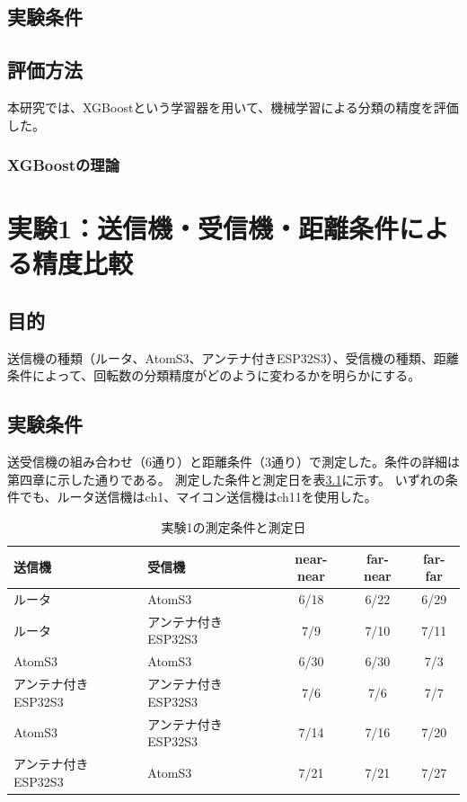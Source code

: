 \documentclass[uplatex, 12pt]{ujbook}
\begin{document}
\section{実験条件}

\section{評価方法}
本研究では、XGBoostという学習器を用いて、機械学習による分類の精度を評価した。
\subsection{XGBoostの理論}

\chapter{実験1：送信機・受信機・距離条件による精度比較}
\section{目的}
送信機の種類（ルータ、AtomS3、アンテナ付きESP32S3）、受信機の種類、距離条件によって、回転数の分類精度がどのように変わるかを明らかにする。
\section{実験条件}
送受信機の組み合わせ（6通り）と距離条件（3通り）で測定した。条件の詳細は第四章に示した通りである。
測定した条件と測定日を表\ref{tab:exp1}に示す。
いずれの条件でも、ルータ送信機はch1、マイコン送信機はch11を使用した。

\begin{table}[htbp]
  \centering
  \caption{実験1の測定条件と測定日}
  \label{tab:exp1}
  \begin{tabular}{l l c c c}
    \toprule
    送信機 & 受信機 & near-near & far-near & far-far \\
    \midrule
    ルータ & AtomS3 & 6/18 & 6/22 & 6/29 \\
    ルータ & アンテナ付きESP32S3 & 7/9 & 7/10 & 7/11 \\
    AtomS3 & AtomS3 & 6/30 & 6/30 & 7/3 \\
    アンテナ付きESP32S3 & アンテナ付きESP32S3 & 7/6 & 7/6 & 7/7 \\
    AtomS3 & アンテナ付きESP32S3 & 7/14 & 7/16 & 7/20 \\
    アンテナ付きESP32S3 & AtomS3 & 7/21 & 7/21 & 7/27 \\
    \bottomrule
  \end{tabular}
\end{table}
\end{document}
